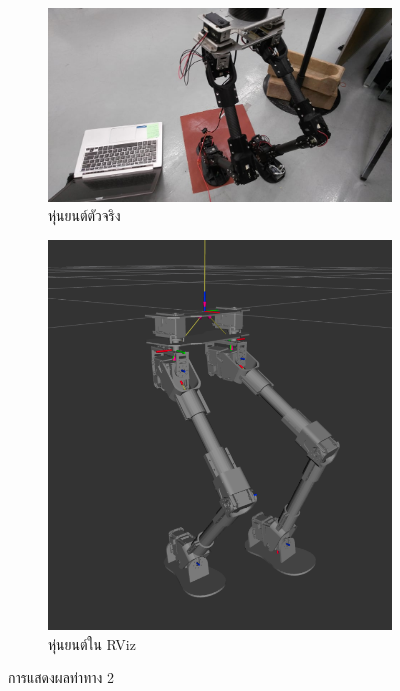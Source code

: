 \begin{figure}[!ht]
    \centering
    \begin{subfigure}[b]{0.45\textwidth}
        \centering
        \includegraphics[width=\textwidth]{chapter4/images/robot_2_rviz2.jpg}
        \caption{หุ่นยนต์ตัวจริง}
    \end{subfigure}
    \hfill
    \begin{subfigure}[b]{0.32\textwidth}
        \centering
        \includegraphics[width=\textwidth]{chapter4/images/robot_2_rviz2.png}
        \caption{หุ่นยนต์ใน RViz}
    \end{subfigure}
    \caption{การแสดงผลท่าทาง 2}
	\label{fig:robot_2_rviz2}
\end{figure}


